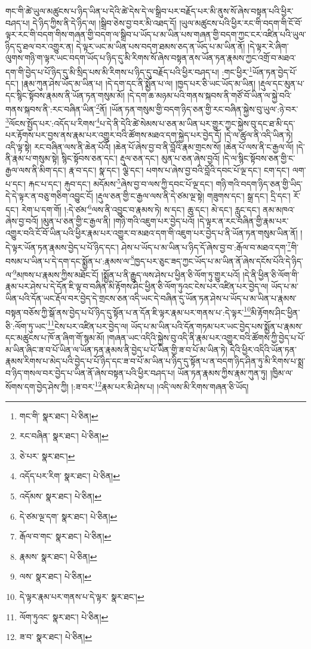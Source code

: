 གང་གི་ཚེ་ཡུལ་མཚུངས་པ་ཉིད་ཡིན་པ་དེའི་ཚེ་དེས་དེ་ལ་སྒྲིབ་པར་བརྗོད་པར་མི་ནུས་སོ་ཞེས་བསྟན་པའི་ཕྱིར་བཤད་པ། དེ་ཉིད་ཀྱིས་ནི་དེ་ཉིད་ལ། །སྒྲིབ་ཅེས་བྱ་བར་མི་འཐད་དོ། །ཡུལ་མཚུངས་པའི་ཕྱིར་རང་གི་བདག་གི་ངོ་བོ་ལྟར་རང་གི་བདག་གིས་གཞན་གྱི་བདག་ལ་སྒྲིབ་པ་ཡོད་པ་མ་ཡིན་པས་གཞན་གྱི་བདག་ཀྱང་ངར་འཛིན་པའི་ཡུལ་ཉིད་དུ་ཐལ་བར་འགྱུར་ན། དེ་ལྟར་ཡང་མ་ཡིན་པས་བདག་ཐམས་ཅད་ན་ཡོད་པ་མ་ཡིན་ནོ། །དེ་ལྟར་རེ་ཞིག་ལུགས་གཉི་ག་ལྟར་ཡང་བདག་ཡོད་པ་ཉིད་དུ་མི་རིགས་སོ་ཞེས་བསྟན་ནས་ཡོན་ཏན་རྣམས་ཀྱང་འགྲོ་བ་མཐའ་དག་གི་བྱེད་པ་པོ་ཉིད་དུ་མི་སྲིད་པས་མི་རིགས་པ་ཉིད་དུ་བརྗོད་པའི་ཕྱིར་བཤད་པ། :གང་ཕྱིར་\footnote{གང་གི་  སྣར་ཐང་།  པེ་ཅིན། }ཡོན་ཏན་བྱེད་པོ་དང་། །རྣམ་ཀུན་ཤེས་ཡོད་མ་ཡིན་པ། །དེ་དག་དང་ནི་སྨྱོན་པ་ལ། །ཁྱད་པར་ཅི་ཡང་ཡོད་མ་ཡིན། །རྡུལ་དང་མུན་པ་དང་སྙིང་སྟོབས་རྣམས་ནི་ཡོན་ཏན་གསུམ་མོ། །དེ་དག་ཆ་མཉམ་པའི་གནས་སྐབས་ནི་གཙོ་བོ་ཡིན་ལ་སྐྱེ་བའི་གནས་སྐབས་ནི་:རང་བཞིན་ཡིན་\footnote{རང་བཞིན་  སྣར་ཐང་།  པེ་ཅིན། }ནོ། །ཡོན་ཏན་གསུམ་གྱི་བདག་ཉིད་ཅན་གྱི་རང་བཞིན་སྐྱེས་བུ་ཡུལ་:ཉེ་བར་\footnote{ཅེ་པར་  སྣར་ཐང་། }ལོངས་སྤྱོད་པར་:འདོད་པ་རིགས་\footnote{འདོད་པར་རིག་  སྣར་ཐང་།  པེ་ཅིན། }པ་དེ་ནི་དེའི་ཚེ་སེམས་པ་ཅན་མ་ཡིན་པར་གྱུར་ཀྱང་སྐྱེས་བུ་དང་ཐ་མི་དད་པར་རྟོགས་པར་བྱས་ནས་རྣམ་པར་འགྱུར་བའི་ཚོགས་མཐའ་དག་སྐྱེད་པར་བྱེད་དོ། །དེ་ལ་ཚུལ་ནི་འདི་ཡིན་ཏེ། འདི་ལྟ་སྟེ། རང་བཞིན་ལས་ནི་ཆེན་པོའོ། །ཆེན་པོ་ཞེས་བྱ་བ་ནི་བློའི་རྣམ་གྲངས་སོ། །ཆེན་པོ་ལས་ནི་ང་རྒྱལ་ལོ། །དེ་ནི་རྣམ་པ་གསུམ་སྟེ། སྙིང་སྟོབས་ཅན་དང་། རྡུལ་ཅན་དང་། མུན་པ་ཅན་ཞེས་བྱའོ། །དེ་ལ་སྙིང་སྟོབས་ཅན་གྱི་ང་རྒྱལ་ལས་ནི་མིག་དང་། རྣ་བ་དང་། སྣ་དང་། ལྕེ་དང་། པགས་པ་ཞེས་བྱ་བའི་བློའི་དབང་པོ་ལྔ་དང་། ངག་དང་། ལག་པ་དང་། རྐང་པ་དང་། རྐུབ་དང་། མདོམས་\footnote{འདོམས་  སྣར་ཐང་།  པེ་ཅིན། }ཞེས་བྱ་བ་ལས་ཀྱི་དབང་པོ་ལྔ་དང་། གཉི་གའི་བདག་ཉིད་ཅན་གྱི་ཡིད་དེ་དེ་ལྟར་ན་བཅུ་གཅིག་འབྱུང་ངོ། །རྡུལ་ཅན་གྱི་ང་རྒྱལ་ལས་ནི་དེ་ཙམ་ལྔ་སྟེ། གཟུགས་དང་། སྒྲ་དང་། དྲི་དང་། རོ་དང་། རེག་པ་དག་གོ། །:དེ་ཙམ་\footnote{དེ་ཙམ་ལྔ་དག་  སྣར་ཐང་།  པེ་ཅིན། }ལས་ནི་འབྱུང་བ་རྣམས་ཏེ། ས་དང་། ཆུ་དང་། མེ་དང་། རླུང་དང་། ནམ་མཁའ་ཞེས་བྱ་བའོ། །མུན་པ་ཅན་གྱི་ང་རྒྱལ་ནི། །གཉི་གའི་འཇུག་པར་བྱེད་པའོ། །དེ་ལྟར་ན་རང་བཞིན་གྱི་རྣམ་པར་འགྱུར་བའི་ངོ་བོ་ཡིན་པའི་ཕྱིར་རྣམ་པར་འགྱུར་བ་མཐའ་དག་གི་འཇུག་པར་བྱེད་པ་ནི་ཡོན་ཏན་གསུམ་ཡིན་ནོ། །དེ་ལྟར་ཡོན་ཏན་རྣམས་བྱེད་པ་པོ་ཉིད་དང་། ཤེས་པ་ཡོད་པ་མ་ཡིན་པ་ཉིད་དོ་ཞེས་བྱ་བ་:རྒོལ་བ་མཐའ་དག་\footnote{རྒོལ་བ་གང་  སྣར་ཐང་།  པེ་ཅིན། }གི་བསམ་པ་ཡིན་པ་དེ་དག་དང་སྨྱོན་པ་:རྣམས་ལ་\footnote{རྣམས་  སྣར་ཐང་།  པེ་ཅིན། }ཁྱད་པར་ཅུང་ཟད་ཀྱང་ཡོད་པ་མ་ཡིན་ནོ་ཞེས་དངོས་པོའི་དེ་ཉིད་ལ་\footnote{ལས་  སྣར་ཐང་།  པེ་ཅིན། }མཁས་པ་རྣམས་ཀྱིས་མཐོང་ངོ། །སྨྱོན་པ་ནི་རྒྱུད་ལས་ཤེས་པ་ཕྱིན་ཅི་ལོག་ཏུ་གྱུར་པའོ། །དེ་ནི་ཕྱིན་ཅི་ལོག་གི་རྣམ་པར་ཤེས་པ་དེ་དོན་ཇི་ལྟ་བ་བཞིན་མི་རྟོགས་ཤིང་ཕྱིན་ཅི་ལོག་ཏུའང་ངེས་པར་འཛིན་པར་བྱེད་ལ། ཡོད་པ་མ་ཡིན་པའི་དོན་ཡང་རྡོལ་བར་བྱེད་དེ་གྲངས་ཅན་འདི་ཡང་དེ་བཞིན་དུ་ཡོན་ཏན་ཤེས་པ་ཡོད་པ་མ་ཡིན་པ་རྣམས་བསྟན་བཅོས་ཀྱི་སྒོ་ནས་བྱེད་པ་པོ་ཉིད་དུ་སྟོན་པ་ན་དོན་ཇི་ལྟར་རྣམ་པར་གནས་པ་:དེ་ལྟར་\footnote{དེ་ལྟར་རྣམ་པར་གནས་པ་དེ་ལྟར་  སྣར་ཐང་། }མི་རྟོགས་ཤིང་ཕྱིན་ཅི་:ལོག་ཏུ་ཡང་\footnote{ལོག་ཏུའང་  སྣར་ཐང་།  པེ་ཅིན། }ངེས་པར་འཛིན་པར་བྱེད་ལ། ཡོད་པ་མ་ཡིན་པའི་དོན་གཏམ་པར་ཡང་བྱེད་པས་སྨྱོན་པ་རྣམས་དང་མཚུངས་པ་ཁོ་ན་ཞིག་གོ་སྙམ་མོ། །གཞན་ཡང་འདིའི་སྐྱེས་བུ་འདི་ནི་རྣམ་པར་འགྱུར་བའི་ཚོགས་ཀྱི་བྱེད་པ་པོ་མ་ཡིན་ཞིང་ཟ་བ་པོ་ཡིན་ལ་ཡོན་ཏན་རྣམས་ནི་བྱེད་པ་པོ་ཡིན་གྱི་ཟ་བ་པོ་མ་ཡིན་ཏེ། དེའི་ཕྱིར་འདིའི་ཡོན་ཏན་རྣམས་རིགས་པ་མེད་པའི་བྱེད་པ་པོ་ཉིད་དང་ཟ་བ་པོ་མ་ཡིན་པ་ཉིད་དུ་སྟོན་པ་ན་བདག་ཉིད་ཤིན་ཏུ་མི་རིགས་པ་སྨྲ་བ་ཉིད་གསལ་བར་བྱེད་པ་ཡིན་ནོ་ཞེས་བསྟན་པའི་ཕྱིར་བཤད་པ། ཡོན་ཏན་རྣམས་ཀྱིས་རྣམ་ཀུན་ཏུ། །ཁྱིམ་ལ་སོགས་དག་བྱེད་ཤེས་ཀྱི། །:ཟ་བར་\footnote{ཟ་བ་  སྣར་ཐང་།  པེ་ཅིན། }རྣམ་པར་མི་ཤེས་པ། །འདི་ལས་མི་རིགས་གཞན་ཅི་ཡོད། 